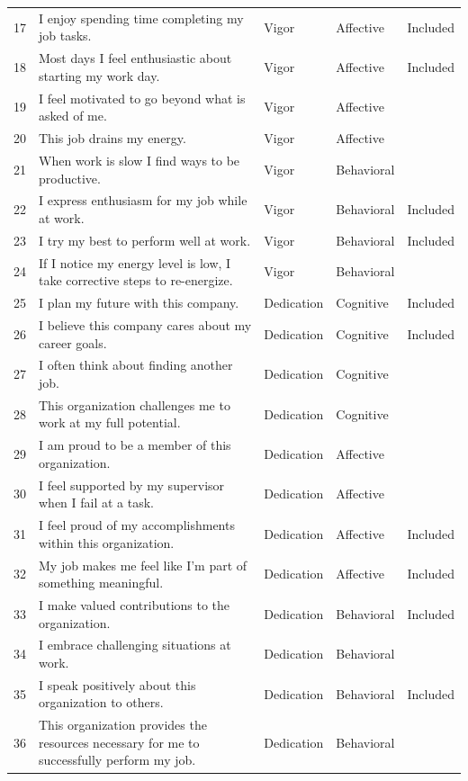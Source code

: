 \documentclass[
  english,
  man]{apa7}
\begin{document}
\begin{table}[tbp]
\begin{center}
\begin{threeparttable}
\begin{tabular}{lllll}
17 & I enjoy spending time completing my job tasks. & Vigor & Affective & Included\\
18 & Most days I feel enthusiastic about starting my work day. & Vigor & Affective & Included\\
19 & I feel motivated to go beyond what is asked of me. & Vigor & Affective & \\
20 & This job drains my energy. & Vigor & Affective & \\
21 & When work is slow I find ways to be productive. & Vigor & Behavioral & \\
22 & I express enthusiasm for my job while at work. & Vigor & Behavioral & Included\\
23 & I try my best to perform well at work. & Vigor & Behavioral & Included\\
24 & If I notice my energy level is low, I take corrective steps to re-energize. & Vigor & Behavioral & \\
25 & I plan my future with this company. & Dedication & Cognitive & Included\\
26 & I believe this company cares about my career goals. & Dedication & Cognitive & Included\\
27 & I often think about finding another job. & Dedication & Cognitive & \\
28 & This organization challenges me to work at my full potential. & Dedication & Cognitive & \\
29 & I am proud to be a member of this organization. & Dedication & Affective & \\
30 & I feel supported by my supervisor when I fail at a task. & Dedication & Affective & \\
31 & I feel proud of my accomplishments within this organization. & Dedication & Affective & Included\\
32 & My job makes me feel like I'm part of something meaningful. & Dedication & Affective & Included\\
33 & I make valued contributions to the organization. & Dedication & Behavioral & Included\\
34 & I embrace challenging situations at work. & Dedication & Behavioral & \\
35 & I speak positively about this organization to others. & Dedication & Behavioral & Included\\
36 & This organization provides the resources necessary for me to successfully perform my job. & Dedication & Behavioral & \\
\bottomrule
\end{tabular}

\end{threeparttable}
\end{center}

\end{table}
\end{document}
